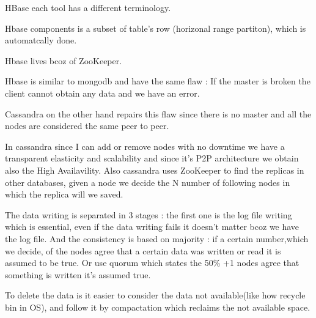 \documentclass[a4page, 11pt]{article}
\begin{document}
HBase each tool has a different terminology.

Hbase components is a subset of table's row (horizonal range partiton), which is automatcally done.

Hbase lives bcoz of ZooKeeper.

Hbase is similar to mongodb and have the same flaw : If the master is broken the client cannot obtain any data and we have an error.

Cassandra on the other hand repairs this flaw since there is no master and all the nodes are considered the same peer to peer.

In cassandra since I can add or remove nodes with no downtime we have a transparent elasticity and scalability and since it's P2P architecture we obtain also the High Availavility. 
Also cassandra uses ZooKeeper to find the replicas in other databases, given a node we decide the N number of following nodes in which the replica will we saved.

The data writing is separated in 3 stages : the first one is the log file writing which is essential, even if the data writing fails it doesn't matter bcoz we have the log file. 
And the consistency is based
on majority : if a certain number,which we decide, of the nodes agree that a certain data was written or read it is assumed to be true. 
Or use quorum which states the 50\% +1 nodes agree that something is written it's assumed true.

To delete the data is it easier to consider the data not available(like how recycle bin in OS), and follow it by compactation which reclaims the not available space.
\end{document}
